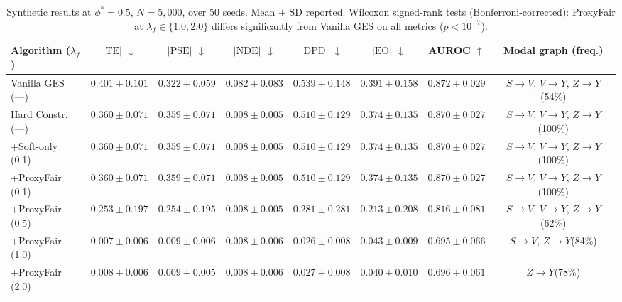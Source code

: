 \begin{table}[t]
\centering
\caption{%
Synthetic results at $\phi^* = 0.5$, $N = 5{,}000$,
over 50 seeds. Mean $\pm$ SD reported. Wilcoxon signed-rank tests
(Bonferroni-corrected): ProxyFair at $\lambda_f \!\in\! \{1.0, 2.0\}$
differs significantly
from Vanilla GES on all metrics ($p < 10^{-7}$).
}
\label{tab:main_results}
\renewcommand{\arraystretch}{1.15}
\small
\setlength{\tabcolsep}{3pt}
\begin{tabular}{@{}l c c c c c c c@{}}
\toprule
\textbf{Algorithm ($\lambda_f$)}
  & \textbf{$|\text{TE}|$} $\downarrow$
  & \textbf{$|\text{PSE}|$} $\downarrow$
  & \textbf{$|\text{NDE}|$} $\downarrow$
  & \textbf{$|\text{DPD}|$} $\downarrow$
  & \textbf{$|\text{EO}|$} $\downarrow$
  & \textbf{AUROC} $\uparrow$
  & \textbf{Modal graph (freq.)} \\
\midrule
Vanilla GES  (---)
  & $0.401{\pm}0.101$
  & $0.322{\pm}0.059$
  & $0.082{\pm}0.083$
  & $0.539{\pm}0.148$
  & $0.391{\pm}0.158$
  & $0.872{\pm}0.029$
  & $S{\to}V,\, V{\to}Y,\, Z{\to}Y$\;\;(54\%) \\
Hard Constr.  (---)
  & $0.360{\pm}0.071$
  & $0.359{\pm}0.071$
  & $0.008{\pm}0.005$
  & $0.510{\pm}0.129$
  & $0.374{\pm}0.135$
  & $0.870{\pm}0.027$
  & $S{\to}V,\, V{\to}Y,\, Z{\to}Y$\;\;(100\%) \\
\midrule
+Soft-only  (0.1)
  & $0.360{\pm}0.071$
  & $0.359{\pm}0.071$
  & $0.008{\pm}0.005$
  & $0.510{\pm}0.129$
  & $0.374{\pm}0.135$
  & $0.870{\pm}0.027$
  & $S{\to}V,\, V{\to}Y,\, Z{\to}Y$\;\;(100\%) \\
+ProxyFair  (0.1)
  & $0.360{\pm}0.071$
  & $0.359{\pm}0.071$
  & $0.008{\pm}0.005$
  & $0.510{\pm}0.129$
  & $0.374{\pm}0.135$
  & $0.870{\pm}0.027$
  & $S{\to}V,\, V{\to}Y,\, Z{\to}Y$\;\;(100\%) \\
+ProxyFair  (0.5)
  & $0.253{\pm}0.197$
  & $0.254{\pm}0.195$
  & $0.008{\pm}0.005$
  & $0.281{\pm}0.281$
  & $0.213{\pm}0.208$
  & $0.816{\pm}0.081$
  & $S{\to}V,\, V{\to}Y,\, Z{\to}Y$\;\;(62\%) \\
+ProxyFair  (1.0)
  & $0.007{\pm}0.006$
  & $0.009{\pm}0.006$
  & $0.008{\pm}0.006$
  & $0.026{\pm}0.008$
  & $0.043{\pm}0.009$
  & $0.695{\pm}0.066$
  & $S{\to}V,\, Z{\to}Y$\;\;(84\%) \\
+ProxyFair  (2.0)
  & $0.008{\pm}0.006$
  & $0.009{\pm}0.005$
  & $0.008{\pm}0.006$
  & $0.027{\pm}0.008$
  & $0.040{\pm}0.010$
  & $0.696{\pm}0.061$
  & $Z{\to}Y$\;\;(78\%) \\
\bottomrule
\end{tabular}
\end{table}
